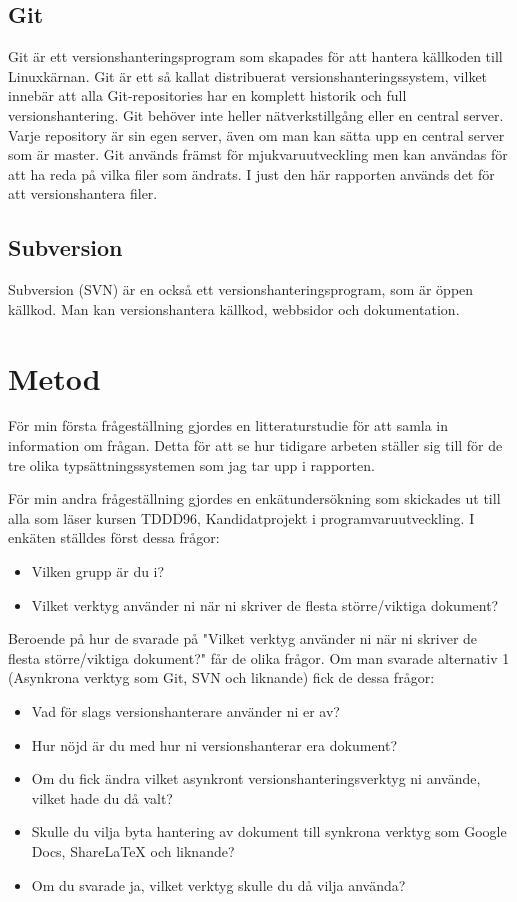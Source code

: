 \subsection{Git}
Git är ett versionshanteringsprogram som skapades för att hantera källkoden till Linuxkärnan. Git är ett så kallat distribuerat versionshanteringssystem, vilket innebär att alla Git-repositories har en komplett historik och full versionshantering. Git behöver inte heller nätverkstillgång eller en central server. Varje repository är sin egen server, även om man kan sätta upp en central server som är master. Git används främst för mjukvaruutveckling men kan användas för att ha reda på vilka filer som ändrats. I just den här rapporten används det för att versionshantera \latex filer.

\subsection{Subversion}
Subversion (SVN) är en också ett versionshanteringsprogram, som är öppen källkod. Man kan versionshantera källkod, webbsidor och dokumentation. 

\section{Metod}
\label{sec:method-tuhkala}

För min första frågeställning gjordes en litteraturstudie för att samla in information om frågan. Detta för att se hur tidigare arbeten ställer sig till för de tre olika typsättningssystemen som jag tar upp i rapporten.

För min andra frågeställning gjordes en enkätundersökning som skickades ut till alla som läser kursen TDDD96, Kandidatprojekt i programvaruutveckling. I enkäten ställdes först dessa frågor:
\begin{itemize}
	\item Vilken grupp är du i?
	\item Vilket verktyg använder ni när ni skriver de flesta större/viktiga dokument?
\end{itemize}

Beroende på hur de svarade på "Vilket verktyg använder ni när ni skriver de flesta större/viktiga dokument?" får de olika frågor. Om man svarade alternativ 1 (Asynkrona verktyg som Git, SVN och liknande) fick de dessa frågor:

\begin{itemize}
	\item Vad för slags versionshanterare använder ni er av?
	\item Hur nöjd är du med hur ni versionshanterar era dokument?
	\item Om du fick ändra vilket asynkront versionshanteringsverktyg ni använde, vilket hade du då valt?
	\item Skulle du vilja byta hantering av dokument till synkrona verktyg som Google Docs, ShareLaTeX och liknande?
	\item Om du svarade ja, vilket verktyg skulle du då vilja använda?
\end{itemize}

